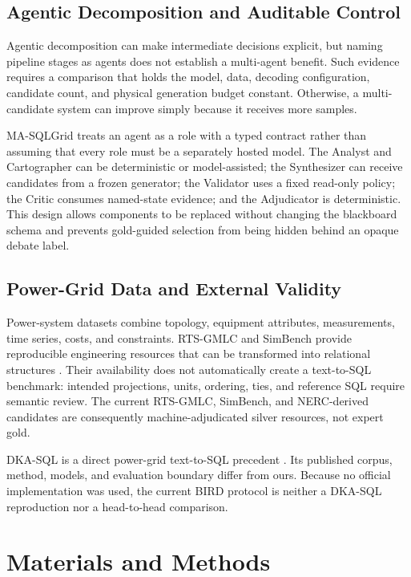 \documentclass[applsci,article,submit,moreauthors]{Definitions/mdpi}
\newcommand{\masql}{MA-SQLGrid}
\begin{document}
\subsection{Agentic Decomposition and Auditable Control}

Agentic decomposition can make intermediate decisions explicit, but naming pipeline stages as agents does not establish a multi-agent benefit. Such evidence requires a comparison that holds the model, data, decoding configuration, candidate count, and physical generation budget constant. Otherwise, a multi-candidate system can improve simply because it receives more samples.

\masql{} treats an agent as a role with a typed contract rather than assuming that every role must be a separately hosted model. The Analyst and Cartographer can be deterministic or model-assisted; the Synthesizer can receive candidates from a frozen generator; the Validator uses a fixed read-only policy; the Critic consumes named-state evidence; and the Adjudicator is deterministic. This design allows components to be replaced without changing the blackboard schema and prevents gold-guided selection from being hidden behind an opaque debate label.

\subsection{Power-Grid Data and External Validity}

Power-system datasets combine topology, equipment attributes, measurements, time series, costs, and constraints. RTS-GMLC and SimBench provide reproducible engineering resources that can be transformed into relational structures \cite{barrows2020rts,meinecke2020simbench}. Their availability does not automatically create a text-to-SQL benchmark: intended projections, units, ordering, ties, and reference SQL require semantic review. The current RTS-GMLC, SimBench, and NERC-derived candidates are consequently machine-adjudicated silver resources, not expert gold.

DKA-SQL is a direct power-grid text-to-SQL precedent \cite{bian2025dkasql}. Its published corpus, method, models, and evaluation boundary differ from ours. Because no official implementation was used, the current BIRD protocol is neither a DKA-SQL reproduction nor a head-to-head comparison.

\section{Materials and Methods}
\end{document}
